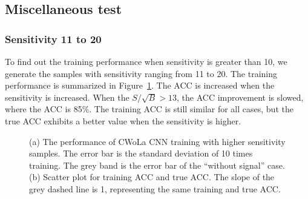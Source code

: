 \documentclass[12pt]{article}
\begin{document}
	\subsection{Miscellaneous test}%
	\label{sub:miscellaneous_test}
		\subsubsection{Sensitivity 11 to 20}%
		\label{subs:sensitivity_11_to_20}
			To find out the training performance when sensitivity is greater than 10, we generate the samples with sensitivity ranging from 11 to 20. The training performance is summarized in Figure~\ref{fig:cwola_cnn_training_performance_11_20}. The ACC is increased when the sensitivity is increased. When the $S / \sqrt{B} > 13$, the ACC improvement is slowed, where the ACC is 85\%. The training ACC is still similar for all cases, but the true ACC exhibits a better value when the sensitivity is higher.
			\begin{figure}[htpb]
				\centering
				\caption{(a) The performance of CWoLa CNN training with higher sensitivity samples. The error bar is the standard deviation of 10 times training. The grey band is the error bar of the ``without signal'' case. (b) Scatter plot for training ACC and true ACC. The slope of the grey dashed line is 1, representing the same training and true ACC.}
				\label{fig:cwola_cnn_training_performance_11_20}
			\end{figure}
\end{document}

